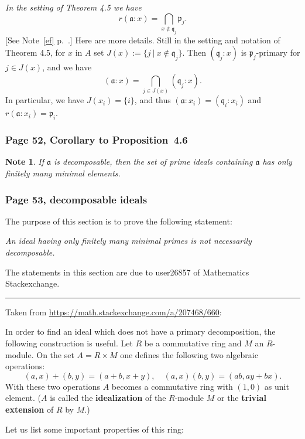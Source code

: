 \documentclass[12pt,letterpaper]{article}%
\newcommand{\mf}{\mathfrak}
\newcommand{\aaa}{\mf a}
\newcommand{\ppp}{\mf p}
\newcommand{\qqq}{\mf q}
\newcommand{\nn}{\noindent}
\newtheorem{note}[thm]{Note}
\begin{document}
\nn\emph{In the setting of Theorem 4.5 we have} 
\begin{equation}\label{ex4.5}
r(\aaa:x)=\bigcap_{x\notin\qqq_j}\ppp_j.
\end{equation}
[See Note~\ref{ef} p.~\pageref{ef}.] Here are more details. Still in the setting and notation of Theorem 4.5, for $x$ in $A$ set $J(x):=\{j\ |\ x\notin\qqq_j\}$. Then $(\qqq_j:x)$ is $\ppp_j$-primary for $j\in J(x)$, and we have 
$$
(\aaa:x)=\bigcap_{j\in J(x)}(\qqq_j:x).
$$ 
In particular, we have $J(x_i)=\{i\}$, and thus $(\aaa:x_i)=(\qqq_i:x_i)$ and $r(\aaa:x_i)=\ppp_i$. 

\subsubsection{Page 52, Corollary to Proposition~4.6}%

\begin{note}\label{fmme}
If $\aaa$ is decomposable, then the set of prime ideals containing $\aaa$ has only finitely many minimal elements.
\end{note}

\subsubsection{Page 53, decomposable ideals}\label{di}%

The purpose of this section is to prove the following statement:

\nn\emph{An ideal having only finitely many minimal primes is not necessarily decomposable.}

The statements in this section are due to user26857 of Mathematics Stackexchange.\bigskip\bigskip

\hrule\bigskip

\nn Taken from \href{https://math.stackexchange.com/a/207468/660}{https://math.stackexchange.com/a/207468/660}:

In order to find an ideal which does not have a primary decomposition, the following construction is useful. Let $R$ be a commutative ring and $M$ an $R$-module. On the set $A=R\times M$ one defines the following two algebraic operations:
$$
(a,x)+(b,y)=(a+b,x+y),\quad(a,x)(b,y)=(ab,ay+bx).
$$
With these two operations $A$ becomes a commutative ring with $(1,0)$ as unit element. ($A$
is called the \textbf{idealization} of the $R$-module $M$ or the \textbf{trivial extension} of $R$ by $M$.)

Let us list some important properties of this ring:
\end{document}
